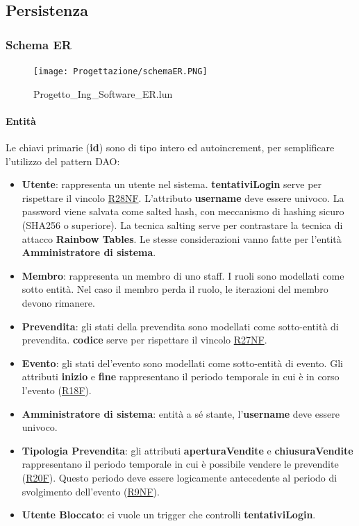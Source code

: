 \documentclass[a4paper]{article}
\begin{document}
\newpage

\subsection{Persistenza}

\subsubsection{Schema ER}

\begin{figure}[H]
    \texttt{[image: Progettazione/schemaER.PNG]}
    \centering
    \caption{Progetto\_Ing\_Software\_ER.lun}
\end{figure}

\paragraph{Entità} Le chiavi primarie (\textbf{id}) sono di tipo intero ed autoincrement, per semplificare l'utilizzo del pattern DAO:

\begin{itemize}
    \item \textbf{Utente}: rappresenta un utente nel sistema. \textbf{tentativiLogin} serve per rispettare il vincolo \hyperlink{R28NF}{R28NF}. L'attributo \textbf{username} deve essere univoco. La password viene salvata come salted hash, con meccanismo di hashing sicuro (SHA256 o superiore). La tecnica salting serve per contrastare la tecnica di attacco \textbf{Rainbow Tables}. Le stesse considerazioni vanno fatte per l'entità \textbf{Amministratore di sistema}.
    \item \textbf{Membro}: rappresenta un membro di uno staff. I ruoli sono modellati come sotto entità. Nel caso il membro perda il ruolo, le iterazioni del membro devono rimanere.
    \item \textbf{Prevendita}: gli stati della prevendita sono modellati come sotto-entità di prevendita. \textbf{codice} serve per rispettare il vincolo \hyperlink{R27NF}{R27NF}.
    \item \textbf{Evento}: gli stati del'evento sono modellati come sotto-entità di evento. Gli attributi \textbf{inizio} e \textbf{fine} rappresentano il periodo temporale in cui è in corso l'evento (\hyperlink{R18F}{R18F}).
    \item \textbf{Amministratore di sistema}: entità a sé stante, l'\textbf{username} deve essere univoco.
    \item \textbf{Tipologia Prevendita}: gli attributi \textbf{aperturaVendite} e \textbf{chiusuraVendite} rappresentano il periodo temporale in cui è possibile vendere le prevendite (\hyperlink{R20F}{R20F}). Questo periodo deve essere logicamente antecedente al periodo di svolgimento dell'evento (\hyperlink{R9NF}{R9NF}).
    \item \textbf{Utente Bloccato}: ci vuole un trigger che controlli \textbf{tentativiLogin}.
\end{itemize}
\end{document}
